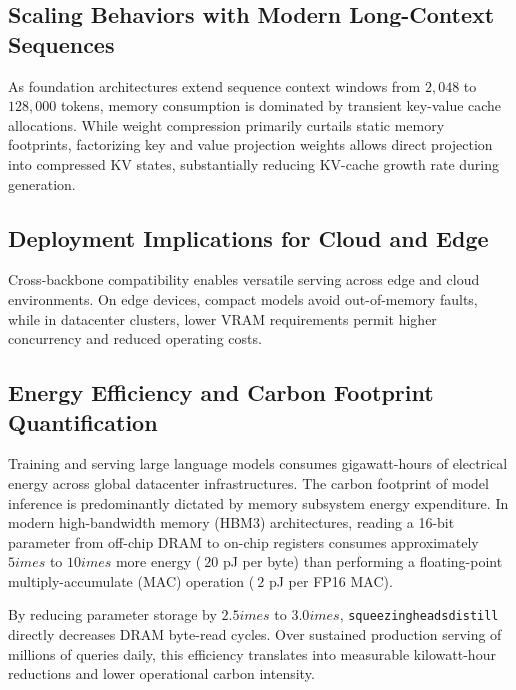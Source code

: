 \subsection{Scaling Behaviors with Modern Long-Context Sequences}
As foundation architectures extend sequence context windows from $2{,}048$ to $128{,}000$ tokens, memory consumption is dominated by transient key-value cache allocations. While weight compression primarily curtails static memory footprints, factorizing key and value projection weights allows direct projection into compressed KV states, substantially reducing KV-cache growth rate during generation.

\subsection{Deployment Implications for Cloud and Edge}
Cross-backbone compatibility enables versatile serving across edge and cloud environments. On edge devices, compact models avoid out-of-memory faults, while in datacenter clusters, lower VRAM requirements permit higher concurrency and reduced operating costs.

\subsection{Energy Efficiency and Carbon Footprint Quantification}
Training and serving large language models consumes gigawatt-hours of electrical energy across global datacenter infrastructures. The carbon footprint of model inference is predominantly dictated by memory subsystem energy expenditure. In modern high-bandwidth memory (HBM3) architectures, reading a 16-bit parameter from off-chip DRAM to on-chip registers consumes approximately $5	imes$ to $10	imes$ more energy ($~20$ pJ per byte) than performing a floating-point multiply-accumulate (MAC) operation ($~2$ pJ per FP16 MAC).

By reducing parameter storage by $2.5	imes$ to $3.0	imes$, \texttt{squeezingheadsdistill} directly decreases DRAM byte-read cycles. Over sustained production serving of millions of queries daily, this efficiency translates into measurable kilowatt-hour reductions and lower operational carbon intensity.

